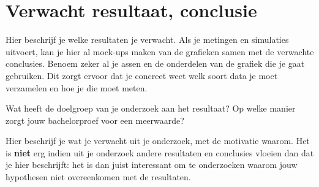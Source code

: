 \section{Verwacht resultaat, conclusie}%
\label{sec:verwachte_resultaten}

Hier beschrijf je welke resultaten je verwacht. Als je metingen en simulaties uitvoert, kan je hier al mock-ups maken van de grafieken samen met de verwachte conclusies. Benoem zeker al je assen en de onderdelen van de grafiek die je gaat gebruiken. Dit zorgt ervoor dat je concreet weet welk soort data je moet verzamelen en hoe je die moet meten.

Wat heeft de doelgroep van je onderzoek aan het resultaat? Op welke manier zorgt jouw bachelorproef voor een meerwaarde?

Hier beschrijf je wat je verwacht uit je onderzoek, met de motivatie waarom. Het is \textbf{niet} erg indien uit je onderzoek andere resultaten en conclusies vloeien dan dat je hier beschrijft: het is dan juist interessant om te onderzoeken waarom jouw hypothesen niet overeenkomen met de resultaten.

